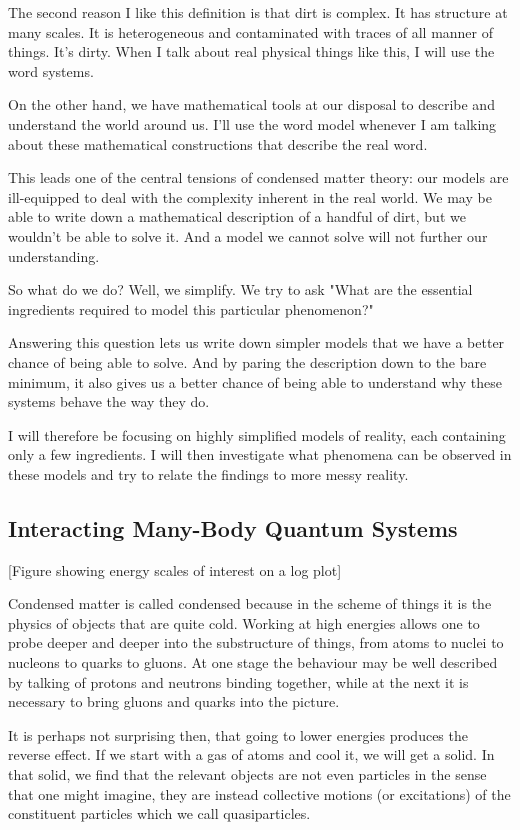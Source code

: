 The second reason I like this definition is that dirt is complex. It has structure at many scales. It is heterogeneous and contaminated with traces of all manner of things. It's dirty. When I talk about real physical things like this, I will use the word systems.

On the other hand, we have mathematical tools at our disposal to describe and understand the world around us. I'll use the word model whenever I am talking about these mathematical constructions that describe the real word. 

This leads one of the central tensions of condensed matter theory: our models are ill-equipped to deal with the complexity inherent in the real world. We may be able to write down a mathematical description of a handful of dirt, but we wouldn't be able to solve it. And a model we cannot solve will not further our understanding.

So what do we do? Well, we simplify. We try to ask "What are the essential ingredients required to model this particular phenomenon?"

Answering this question lets us write down simpler models that we have a better chance of being able to solve. And by paring the description down to the bare minimum, it also gives us a better chance of being able to understand why these systems behave the way they do.

I will therefore be focusing on highly simplified models of reality, each containing only a few ingredients. I will then investigate what phenomena can be observed in these models and try to relate the findings to more messy reality.

\subsection{Interacting Many-Body Quantum Systems}

[Figure showing energy scales of interest on a log plot]

Condensed matter is called condensed because in the scheme of things it is the physics of objects that are quite cold. Working at high energies allows one to probe deeper and deeper into the substructure of things, from atoms to nuclei to nucleons to quarks to gluons. At one stage the behaviour may be well described by talking of protons and neutrons binding together, while at the next it is necessary to bring gluons and quarks into the picture.

It is perhaps not surprising then, that going to lower energies produces the reverse effect. If we start with a gas of atoms and cool it, we will get a solid. In that solid, we find that the relevant objects are not even particles in the sense that one might imagine, they are instead collective motions (or excitations) of the constituent particles which we call quasiparticles.

